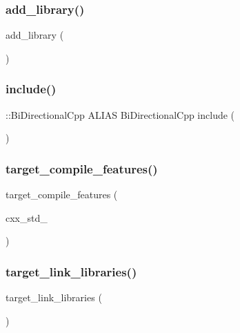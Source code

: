 \subsubsection{\texorpdfstring{add\+\_\+library()}{add\_library()}}
{\footnotesize\ttfamily add\+\_\+library (\begin{DoxyParamCaption}\item[{Bi\+Directional\+Cpp \char`\"{}\char`\"{}}]{ }\end{DoxyParamCaption})}

\mbox{\label{CMakeLists_8txt_a0c926cafdaac2134c40ef08e5a3d03a7}} 
\subsubsection{\texorpdfstring{include()}{include()}}
{\footnotesize\ttfamily \+::Bi\+Directional\+Cpp A\+L\+I\+AS Bi\+Directional\+Cpp include (\begin{DoxyParamCaption}\item[{G\+N\+U\+Install\+Dirs}]{ }\end{DoxyParamCaption})}

\mbox{\label{CMakeLists_8txt_a00c087720f9edbbf1b0a5104e733487e}} 
\subsubsection{\texorpdfstring{target\+\_\+compile\+\_\+features()}{target\_compile\_features()}}
{\footnotesize\ttfamily target\+\_\+compile\+\_\+features (\begin{DoxyParamCaption}\item[{Bi\+Directional\+Cpp P\+U\+B\+L\+IC}]{cxx\+\_\+std\+\_ }\end{DoxyParamCaption})}

\mbox{\label{CMakeLists_8txt_a3bcb5f9875f0f268c3420afcd58e76dd}} 
\subsubsection{\texorpdfstring{target\+\_\+link\+\_\+libraries()}{target\_link\_libraries()}}
{\footnotesize\ttfamily target\+\_\+link\+\_\+libraries (\begin{DoxyParamCaption}\item[{Bi\+Directional\+Cpp P\+R\+I\+V\+A\+TE L\+E\+M\+O\+N\+::\+L\+E\+M\+ON}]{ }\end{DoxyParamCaption})}

